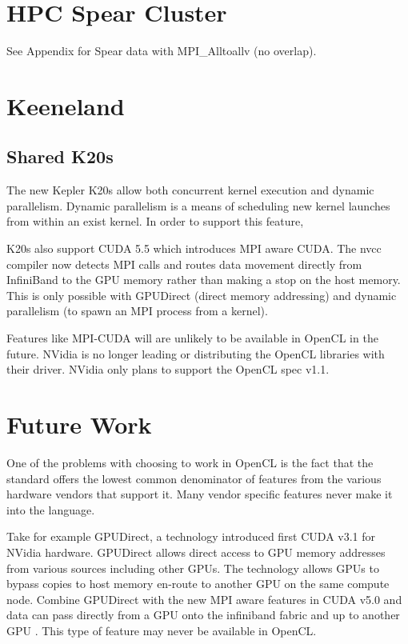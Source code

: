 \documentclass{report}
\begin{document}
\section{HPC Spear Cluster} 
See Appendix for Spear data with MPI\_Alltoallv (no overlap). 
\section{Keeneland}

\subsection{Shared K20s}
The new Kepler K20s allow both concurrent kernel execution and dynamic parallelism. Dynamic parallelism is a means of scheduling new kernel launches from within an exist kernel. In order to support this feature,

K20s also support CUDA 5.5 which introduces MPI aware CUDA. The nvcc compiler now detects MPI calls and routes data movement directly from InfiniBand to the GPU memory rather than making a stop on the host memory. This is only possible with GPUDirect (direct memory addressing) and dynamic parallelism (to spawn an MPI process from a kernel). 

Features like MPI-CUDA will are unlikely to be available in OpenCL in the future. NVidia is no longer leading or distributing the OpenCL libraries with their driver. NVidia only plans to support the OpenCL spec v1.1.


\section{Future Work}

One of the problems with choosing to work in OpenCL is the fact that the standard offers the lowest common denominator of features from the various hardware vendors that support it. Many vendor specific features never make it into the language. 

Take for example GPUDirect, a technology introduced first CUDA v3.1 for NVidia hardware. GPUDirect allows direct access to GPU memory addresses from various sources including other GPUs. The technology allows GPUs to bypass copies to host memory en-route to another GPU on the same compute node. Combine GPUDirect with the new MPI aware features in CUDA v5.0 and data can pass directly from a GPU onto the infiniband fabric and up to another GPU \cite{NvidiaGPUMPI}. This type of feature may never be available in OpenCL. 




\ifstandalone


\end{document}
